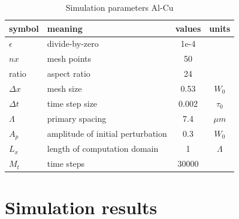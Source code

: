 \documentclass[a4paper,12pt]{article}
\begin{document}
\begin{table}
\centering
\caption{Simulation parameters Al-Cu}
\begin{tabular}{l l c c }
\toprule
symbol & meaning & values & units \\
\midrule
$\epsilon$ & divide-by-zero  & 1e-4  &\\
$nx$ & mesh points & 50 &\\
ratio & aspect ratio & 24 &\\
$\Delta x$ & mesh size & 0.53 & $W_0$ \\
$\Delta t$ & time step size& 0.002& $\tau_0$ \\
$\Lambda$ & primary spacing & 7.4 & $\mu m$ \\
$A_p$ & amplitude of initial perturbation& 0.3 & $W_0$\\
$L_x$ & length of computation domain  &  1  & $\Lambda$\\
$M_t$ & time steps& 30000 & \\
\bottomrule
\end{tabular}
\end{table}

\section{Simulation results}
\end{document}
